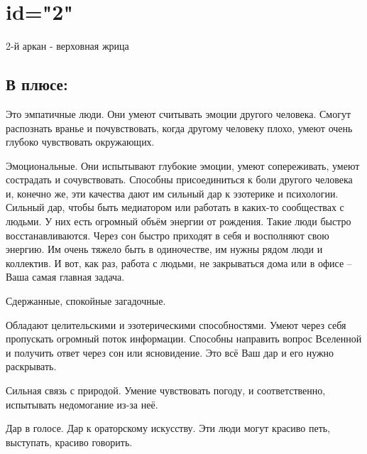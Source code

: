 \endsection

\section{id="2"}{2-й аркан - верховная жрица}

\subsection{В плюсе:}
\item Это эмпатичные люди. Они умеют считывать эмоции другого человека. Смогут распознать вранье и 
почувствовать, когда другому человеку плохо, умеют очень глубоко чувствовать окружающих.

\item Эмоциональные. Они испытывают глубокие эмоции, умеют сопереживать, умеют сострадать и сочувствовать.
Способны присоединиться к боли другого человека и, конечно же, эти качества дают им сильный дар 
к эзотерике и психологии. Сильный дар, чтобы быть медиатором или работать в каких-то сообществах с людьми.
У них есть огромный объём энергии от рождения. Такие люди быстро восстанавливаются. Через сон быстро
приходят в себя и восполняют свою энергию. Им очень тяжело быть в одиночестве, им нужны рядом люди
и коллектив. И вот, как раз, работа с людьми, не закрываться дома или в офисе – Ваша самая главная задача.

\item Сдержанные, спокойные загадочные.
\item Обладают целительскими и эзотерическими способностями.
Умеют через себя пропускать огромный поток информации.                                                                 
Способны направить вопрос Вселенной и получить ответ через сон или ясновидение. Это всё Ваш дар и его нужно раскрывать. 

\item Сильная связь с природой. Умение чувствовать погоду, и соответственно, испытывать недомогание из-за неё.
\item Дар в голосе. Дар к ораторскому искусству. Эти люди могут красиво петь, выступать, красиво говорить.

\endsubsection

